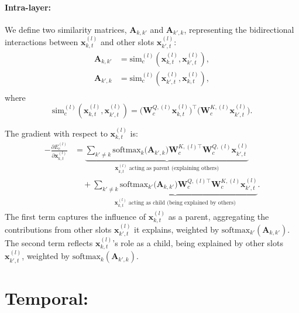 \documentclass{article}
\begin{document}
\paragraph{Intra-layer:}

We define two similarity matrices, \(\bm{A}_{k,k'}\) and \(\bm{A}_{k',k}\), representing the bidirectional interactions between \(\bm{x}_{k,t}^{(l)}\) and other slots \(\bm{x}_{k',t}^{(l)}\):
\begin{equation}
\begin{aligned}
\bm{A}_{k,k'} &= \mathrm{sim}_{c}^{(l)}(\bm{x}_{k,t}^{(l)}, \bm{x}_{k',t}^{(l)}), \\
\bm{A}_{k',k} &= \mathrm{sim}_{c}^{(l)}(\bm{x}_{k',t}^{(l)}, \bm{x}_{k,t}^{(l)}), \\
\end{aligned}
\end{equation}
where 
\[
\mathrm{sim}_{c}^{(l)}(\bm{x}_{k,t}^{(l)}, \bm{x}_{k',t}^{(l)}) 
= \bigl(\bm{W}_{c}^{Q,(l)} \bm{x}_{k,t}^{(l)}\bigr)^\top \bigl(\bm{W}_{c}^{K,(l)} \bm{x}_{k',t}^{(l)}\bigr).
\]

The gradient with respect to \(\bm{x}_{k,t}^{(l)}\) is:
\begin{equation}
\begin{aligned}
-\frac{\partial E_{c}^{(l)}}{\partial \bm{x}_{k,t}^{(l)}}
&=
\underbrace{
\sum_{k'\neq k}
\mathrm{softmax}_{k}\bigl(\bm{A}_{k',k}\bigr)
\bm{W}_{c}^{K,(l)\top} \bm{W}_{c}^{Q,(l)} \bm{x}_{k',t}^{(l)}
}_{\text{\(\bm{x}_{k,t}^{(l)}\) acting as parent (explaining others)}} 
\\
&\quad +
\underbrace{
\sum_{k'\neq k}
\mathrm{softmax}_{k'}\bigl(\bm{A}_{k, k'}\bigr)
\bm{W}_{c}^{Q,(l)\top} \bm{W}_{c}^{K,(l)} \bm{x}_{k',t}^{(l)}
}_{\text{\(\bm{x}_{k,t}^{(l)}\) acting as child (being explained by others)}}.
\end{aligned}
\end{equation}
The first term captures the influence of \(\bm{x}_{k,t}^{(l)}\) as a parent, aggregating the contributions from other slots \(\bm{x}_{k',t}^{(l)}\) it explains, weighted by \(\mathrm{softmax}_{k'}(\bm{A}_{k,k'})\). The second term reflects \(\bm{x}_{k,t}^{(l)}\)'s role as a child, being explained by other slots \(\bm{x}_{k',t}^{(l)}\), weighted by \(\mathrm{softmax}_{k}(\bm{A}_{k',k})\).





\section{Temporal:}
\end{document}
